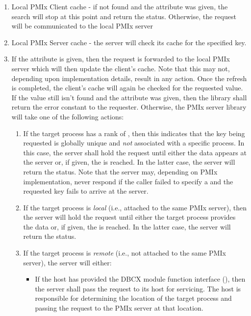 \begin{enumerate}
    \item Local \ac{PMIx} Client cache - if not found and the
     attribute was given, the search will stop at this
    point and return the  status. Otherwise, the
    request will be communicated to the local \ac{PMIx} server

    \item Local \ac{PMIx} Server cache - the server will check its cache for
    the specified key.

    \item If the  attribute is given, then the
    request is forwarded to the local \ac{PMIx} server which will then update
    the client's cache. Note that this may not, depending upon implementation
    details, result in any action. Once the refresh is completed, the client's
    cache will again be checked for the requested value. If the value still
    isn't found and the  attribute was given, then the
    library shall return the  error constant to
    the requester. Otherwise, the \ac{PMIx} server library will take one of
    the following actions:
    \begin{enumerate}
        \item If the target process has a rank of ,
        then this indicates that the key being requested is globally unique
        and \emph{not} associated with a specific process. In this case, the
        server shall hold the request until either the data appears at the
        server or, if given, the  is reached. In the
        latter case, the server will return the 
        status. Note that the server may, depending on \ac{PMIx}
        implementation, never respond if the caller failed to specify a
         and the requested key fails to arrive at the
        server.

        \item If the target process is \emph{local} (i.e., attached to the
        same \ac{PMIx} server), then the server will hold the request until
        either the target process provides the data or, if given, the
         is reached. In the latter case, the server will
        return the  status.

        \item If the target process is \emph{remote} (i.e., not attached to
        the same \ac{PMIx} server), the server will either:
        \begin{itemize}
            \item If the host has provided the \ac{DBCX} module function
            interface (), then the server
            shall pass the request to its host for servicing. The host is
            responsible for determining the location of the target process and
            passing the request to the \ac{PMIx} server at that location.


\end{itemize}
\end{enumerate}
\end{enumerate}
